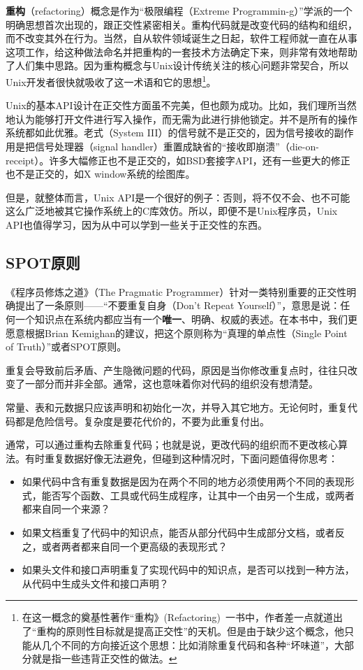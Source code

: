 \documentclass[12pt,oneside]{ctexbook}
\begin{document}
\begin{common-format}
\textbf{重构}（refactoring）概念是作为“极限编程（Extreme Programmin-g）”学派的一个明确思想首次出现的，跟正交性紧密相关。重构代码就是改变代码的结构和组织，而不改变其外在行为。当然，自从软件领域诞生之日起，软件工程师就一直在从事这项工作，给这种做法命名并把重构的一套技术方法确定下来，则非常有效地帮助了人们集中思路。因为重构概念与Unix设计传统关注的核心问题非常契合，所以Unix开发者很快就吸收了这一术语和它的思想\footnote{在这一概念的奠基性著作“重构》(Refactoring)~\cite{Fowler}一书中，作者差一点就道出了“重构的原则性目标就是提高正交性”的天机。但是由于缺少这个概念，他只能从几个不同的方向接近这个思想：比如消除重复代码和各种“坏味道”，大部分就是指一些违背正交性的做法。}。

Unix的基本API设计在正交性方面虽不完美，但也颇为成功。比如，我们理所当然地认为能够打开文件进行写入操作，而无需为此进行排他锁定。并不是所有的操作系统都如此优雅。老式（System III）的信号就不是正交的，因为信号接收的副作用是把信号处理器（signal handler）重置成缺省的“接收即崩溃”（die-on-receipt）。许多大幅修正也不是正交的，如BSD套接字API，还有一些更大的修正也不是正交的，如X window系统的绘图库。

但是，就整体而言，Unix API是一个很好的例子：否则，将不仅不会、也不可能这么广泛地被其它操作系统上的C库效仿。所以，即便不是Unix程序员，Unix API也值得学习，因为从中可以学到一些关于正交性的东西。


\subsection{SPOT原则}
《程序员修炼之道》（The Pragmatic Programmer）针对一类特别重要的正交性明确提出了一条原则——“不要重复自身（Don't Repeat Yourself）”，意思是说：任何一个知识点在系统内都应当有一个\textbf{唯一}、明确、权威的表述。在本书中，我们更愿意根据Brian Kemighan的建议，把这个原则称为“真理的单点性（Single Point of Truth）”或者SPOT原则。

重复会导致前后矛盾、产生隐微问题的代码，原因是当你修改重复点时，往往只改变了一部分而并非全部。通常，这也意味着你对代码的组织没有想清楚。

常量、表和元数据只应该声明和初始化一次，并导入其它地方。无论何时，重复代码都是危险信号。复杂度是要花代价的，不要为此重复付出。

通常，可以通过重构去除重复代码；也就是说，更改代码的组织而不更改核心算法。有时重复数据好像无法避免，但碰到这种情况时，下面问题值得你思考：

\begin{itemize}
\item 如果代码中含有重复数据是因为在两个不同的地方必须使用两个不同的表现形式，能否写个函数、工具或代码生成程序，让其中一个由另一个生成，或两者都来自同一个来源？
\item 如果文档重复了代码中的知识点，能否从部分代码中生成部分文档，或者反之，或者两者都来自同一个更高级的表现形式？
\item 如果头文件和接口声明重复了实现代码中的知识点，是否可以找到一种方法，从代码中生成头文件和接口声明？
\end{itemize}


\end{common-format}
\end{document}
